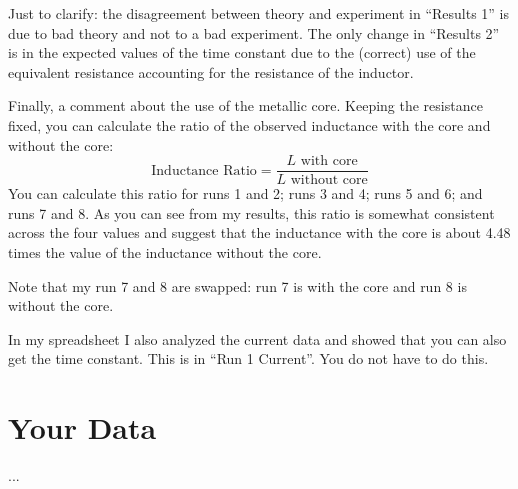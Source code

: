 Just to clarify: the disagreement between theory and experiment in ``Results 1'' is due to bad theory and not to a bad experiment. The only change in ``Results 2'' is in the expected values of the time constant due to the (correct) use of the equivalent resistance accounting for the resistance of the inductor.

Finally, a comment about the use of the metallic core. Keeping the resistance fixed, you can calculate the ratio of the observed inductance with the core and without the core:
\begin{equation}
	\text{Inductance Ratio} = \frac{L \text{ with core}}{L \text{ without core}}
\end{equation}
You can calculate this ratio for runs 1 and 2; runs 3 and 4; runs 5 and 6; and runs 7 and 8. As you can see from my results, this ratio is somewhat consistent across the four values and suggest that the inductance with the core is about 4.48 times the value of the inductance without the core.

Note that my run 7 and 8 are swapped: run 7 is with the core and run 8 is without the core.

In my spreadsheet I also analyzed the current data and showed that you can also get the time constant. This is in ``Run 1 Current''. You do not have to do this.
\section{Your Data}
...
